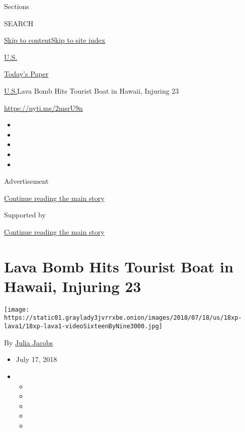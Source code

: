 Sections

SEARCH

\protect\hyperlink{site-content}{Skip to
content}\protect\hyperlink{site-index}{Skip to site index}

\href{https://www.nytimes3xbfgragh.onion/section/us}{U.S.}

\href{https://myaccount.nytimes3xbfgragh.onion/auth/login?response_type=cookie\&client_id=vi}{}

\href{https://www.nytimes3xbfgragh.onion/section/todayspaper}{Today's
Paper}

\href{/section/us}{U.S.}\textbar{}Lava Bomb Hits Tourist Boat in Hawaii,
Injuring 23

\url{https://nyti.ms/2msrU9n}

\begin{itemize}
\item
\item
\item
\item
\item
\end{itemize}

Advertisement

\protect\hyperlink{after-top}{Continue reading the main story}

Supported by

\protect\hyperlink{after-sponsor}{Continue reading the main story}

\hypertarget{lava-bomb-hits-tourist-boat-in-hawaii-injuring-23}{%
\section{Lava Bomb Hits Tourist Boat in Hawaii, Injuring
23}\label{lava-bomb-hits-tourist-boat-in-hawaii-injuring-23}}

\texttt{[image: https://static01.graylady3jvrrxbe.onion/images/2018/07/18/us/18xp-lava1/18xp-lava1-videoSixteenByNine3000.jpg]}

By \href{https://www.nytimes3xbfgragh.onion/by/julia-jacobs}{Julia
Jacobs}

\begin{itemize}
\item
  July 17, 2018
\item
  \begin{itemize}
  \item
  \item
  \item
  \item
  \item
  \end{itemize}
\end{itemize}


